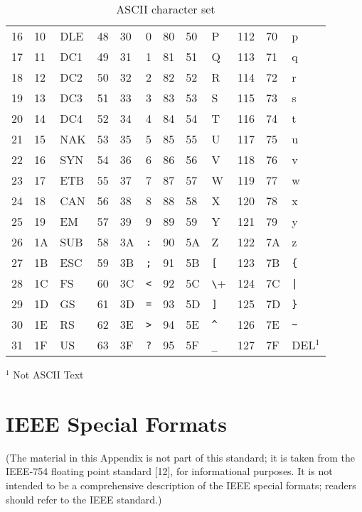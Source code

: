 \begin{table}[hb]
\begin{center}
\begin{tabular}{|lll||lll|lll|lll|}
      \\ 
16 & 10 & DLE & 48 & 30 & 0        & 80 & 50 & P        &112 & 70 & p  
     \\ 
17 & 11 & DC1 & 49 & 31 & 1        & 81 & 51 & Q        &113 & 71 & q  
     \\ 
18 & 12 & DC2 & 50 & 32 & 2        & 82 & 52 & R        &114 & 72 & r   
    \\ 
19 & 13 & DC3 & 51 & 33 & 3        & 83 & 53 & S        &115 & 73 & s   
    \\ 
20 & 14 & DC4 & 52 & 34 & 4        & 84 & 54 & T        &116 & 74 & t   
    \\ 
21 & 15 & NAK & 53 & 35 & 5        & 85 & 55 & U        &117 & 75 & u  
     \\ 
22 & 16 & SYN & 54 & 36 & 6        & 86 & 56 & V        &118 & 76 & v   
    \\ 
23 & 17 & ETB & 55 & 37 & 7        & 87 & 57 & W        &119 & 77 & w 
      \\ 
24 & 18 & CAN & 56 & 38 & 8        & 88 & 58 & X        &120 & 78 & x   
    \\ 
25 & 19 & EM  & 57 & 39 & 9        & 89 & 59 & Y        &121 & 79 & y   
    \\ 
26 & 1A & SUB & 58 & 3A & \verb+:+ & 90 & 5A & Z        &122 & 7A &
z        \\ 
27 & 1B & ESC & 59 & 3B & \verb+;+ & 91 & 5B & \verb+[+ &123 & 7B
& \verb+{+ \\ 
28 & 1C & FS  & 60 & 3C & \verb+<+ & 92 & 5C & \verb+\+ &124 & 7C
& \verb+|+ \\ 
29 & 1D & GS  & 61 & 3D & \verb+=+ & 93 & 5D & \verb+]+ &125 & 7D
& \verb+}+ \\ 
30 & 1E & RS  & 62 & 3E & \verb+>+ & 94 & 5E & \verb+^+ &126 &
7E & \verb+~+ \\ 
31 & 1F & US  & 63 & 3F & \verb+?+ & 95 & 5F & \verb+_+ &127 & 7F
& DEL$^{1}$ \\
\hline                            
\end{tabular}                     
\end{center} 
$^1$ Not ASCII Text                     
\caption[ASCII character set]{ASCII character set}  
\label{t:ascii}                   
\end{table}                       


\chapter{IEEE Special Formats}
   \label{s:spf}
 (The material in this Appendix is not
 part of this standard; it is taken from the IEEE-754 floating
 point standard [12], for informational
 purposes.  It is not intended to be a comprehensive description of
 the IEEE special formats; readers should refer to the IEEE standard.)
 
